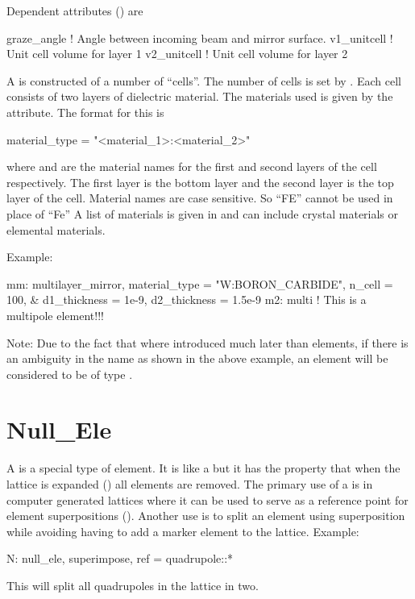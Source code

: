 {
Dependent attributes () are
\begin{example}
  graze_angle      ! Angle between incoming beam and mirror surface.
  v1_unitcell      ! Unit cell volume for layer 1
  v2_unitcell      ! Unit cell volume for layer 2 
\end{example}

A  is constructed of a number of ``cells''. The
number of cells is set by . Each cell consists of two
layers of dielectric material. The materials used is given by
the  attribute. The format for this is
\begin{example}
  material_type = "<material_1>:<material_2>"
\end{example}
where  and  are the material names
for the first and second layers of the cell respectively. The first
layer is the bottom layer and the second layer is the top layer of the
cell.  Material names are case sensitive. So ``FE'' cannot be used in
place of ``Fe'' A list of materials is given in 
and can include crystal materials or elemental materials.

Example:
\begin{example}
  mm: multilayer_mirror, material_type = "W:BORON_CARBIDE", n_cell = 100, &
            d1_thickness = 1e-9, d2_thickness = 1.5e-9
  m2: multi    ! This is a multipole element!!!
\end{example}
Note: Due to the fact that  where introduced much later than 
elements, if there is an ambiguity in the name as shown in the above example, an element will be
considered to be of type .

\section{Null_Ele}
\label{s:null.ele}

A  is a special type of element. It is like a  but it has the property that
when the lattice is expanded () all  elements are removed. The
primary use of a  is in computer generated lattices where it can be used to serve as a
reference point for element superpositions (). Another use is to split an element
using superposition while avoiding having to add a marker element to the lattice. Example:
\begin{example}
  N: null_ele, superimpose, ref = quadrupole::*
\end{example}
This will split all quadrupoles in the lattice in two.

}
